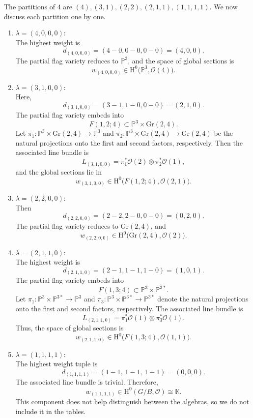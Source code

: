 \documentclass{amsart}
\begin{document}
    
\begin{example}\label{example:flagvarietiesforpartition4}
The partitions of \(4\) are \((4), (3,1), (2,2), (2,1,1), (1,1,1,1)\). We now discuss each partition one by one.

\begin{enumerate}
  \item[(i)] {\textbf{\boldmath$\lambda = (4,0,0,0):$}} \\
  The highest weight is
  \[
  d_{(4,0,0,0)} = (4-0, 0-0, 0-0) = (4, 0, 0).
  \]
  The partial flag variety reduces to \(\mathbb{P}^3\), and the space of global sections is
  \[
  w_{(4,0,0,0)} \in \mathrm{H}^0\big(\mathbb{P}^3, \mathcal{O}(4)\big).
  \]

 \item[(ii)] {\textbf{\boldmath$\lambda = (3,1,0,0):$}} \\
  Here,
  \[
  d_{(3,1,0,0)} = (3-1, 1-0, 0-0) = (2,1,0).
  \]
  The partial flag variety embeds into
  \[
  F(1,2;4) \subset \mathbb{P}^3 \times \mathrm{Gr}(2,4).
  \]
  Let \(\pi_1 : \mathbb{P}^3 \times \mathrm{Gr}(2,4) \to \mathbb{P}^3\) and \(\pi_2 : \mathbb{P}^3 \times \mathrm{Gr}(2,4) \to \mathrm{Gr}(2,4)\) be the natural projections onto the first and second factors, respectively. Then the associated line bundle is
  \[
  L_{(3,1,0,0)} = \pi_1^* \mathcal{O}(2) \otimes \pi_2^* \mathcal{O}(1),
  \]
  and the global sections lie in
  \[
  w_{(3,1,0,0)} \in \mathrm{H}^0\big(F(1,2;4), \mathcal{O}(2,1)\big).
  \]

 \item[(iii)] {\textbf{\boldmath$\lambda = (2,2,0,0):$}} \\
  Then
  \[
  d_{(2,2,0,0)} = (2-2, 2-0, 0-0) = (0,2,0).
  \]
  The partial flag variety reduces to \(\mathrm{Gr}(2,4)\), and
  \[
  w_{(2,2,0,0)} \in \mathrm{H}^0\big(\mathrm{Gr}(2,4), \mathcal{O}(2)\big).
  \]

  \item[(iv)] {\textbf{\boldmath$\lambda = (2,1,1,0):$}} \\
  The highest weight is
  \[
  d_{(2,1,1,0)} = (2-1, 1-1, 1-0) = (1,0,1).
  \]
  The partial flag variety embeds into
  \[
  F(1,3;4) \subset \mathbb{P}^3 \times \mathbb{P}^{3*}.
  \]
  Let \(\pi_1 : \mathbb{P}^3 \times \mathbb{P}^{3*} \to \mathbb{P}^3\) and \(\pi_3 : \mathbb{P}^3 \times \mathbb{P}^{3*} \to \mathbb{P}^{3*}\) denote the natural projections onto the first and second factors, respectively. The associated line bundle is
  \[
  L_{(2,1,1,0)} = \pi_1^* \mathcal{O}(1) \otimes \pi_3^* \mathcal{O}(1).
  \]
  Thus, the space of global sections is
  \[
  w_{(2,1,1,0)} \in \mathrm{H}^0\big(F(1,3;4), \mathcal{O}(1,1)\big).
  \]

    \item[(v)] {\textbf{\boldmath$\lambda = (1,1,1,1):$}} \\
  The highest weight tuple is
  \[
  d_{(1,1,1,1)} = (1 - 1,\, 1 - 1,\, 1 - 1) = (0,0,0).
  \]
  The associated line bundle is trivial. Therefore,
  \[
  w_{(1,1,1,1)} \in \mathrm{H}^0(G/B, \mathcal{O}) \cong \mathbb{K}.
  \]
This component does not help distinguish between the algebras, so we do not include it in the tables.
\end{enumerate}
\end{example}
\end{document}
